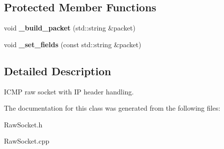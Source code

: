 \subsection*{Protected Member Functions}
\begin{CompactItemize}
\item 
\hypertarget{classsocketpp_1_1ICMP__IP__RawSocket_49a62078d6febf7a11b9350de1e23903}{
void \textbf{\_\-build\_\-packet} (std::string \&packet)}
\label{classsocketpp_1_1ICMP__IP__RawSocket_49a62078d6febf7a11b9350de1e23903}

\item 
\hypertarget{classsocketpp_1_1ICMP__IP__RawSocket_6d2f188d46030afa13f9c3971d43d518}{
void \textbf{\_\-set\_\-fields} (const std::string \&packet)}
\label{classsocketpp_1_1ICMP__IP__RawSocket_6d2f188d46030afa13f9c3971d43d518}

\end{CompactItemize}


\subsection{Detailed Description}
ICMP raw socket with IP header handling. 

The documentation for this class was generated from the following files:\begin{CompactItemize}
\item 
RawSocket.h\item 
RawSocket.cpp\end{CompactItemize}
